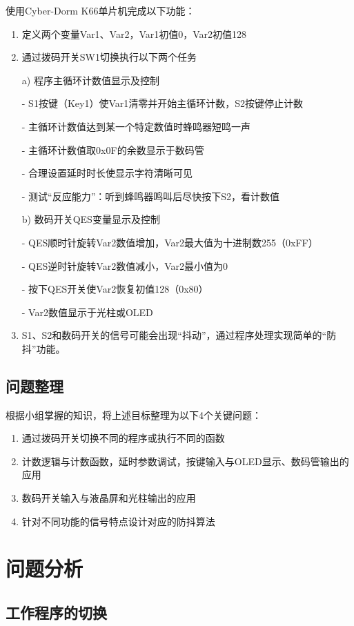 \documentclass[12pt]{article}
\begin{document}
使用Cyber-Dorm K66单片机完成以下功能：
\begin{enumerate}
	\item 定义两个变量Var1、Var2，Var1初值0，Var2初值128
	
	\item 通过拨码开关SW1切换执行以下两个任务
	
	a) 程序主循环计数值显示及控制

    - S1按键（Key1）使Var1清零并开始主循环计数，S2按键停止计数

    - 主循环计数值达到某一个特定数值时蜂鸣器短鸣一声

    - 主循环计数值取0x0F的余数显示于数码管

    - 合理设置延时时长使显示字符清晰可见

    - 测试“反应能力”：听到蜂鸣器鸣叫后尽快按下S2，看计数值

  b) 数码开关QES变量显示及控制

    - QES顺时针旋转Var2数值增加，Var2最大值为十进制数255（0xFF）

    - QES逆时针旋转Var2数值减小，Var2最小值为0

    - 按下QES开关使Var2恢复初值128（0x80）

    - Var2数值显示于光柱或OLED
	\item S1、S2和数码开关的信号可能会出现“抖动”，通过程序处理实现简单的“防抖”功能。
\end{enumerate}

\subsection{问题整理}

根据小组掌握的知识，将上述目标整理为以下4个关键问题：

\begin{enumerate}
	\item 通过拨码开关切换不同的程序或执行不同的函数
	\item 计数逻辑与计数函数，延时参数调试，按键输入与OLED显示、数码管输出的应用
	\item 数码开关输入与液晶屏和光柱输出的应用
	\item 针对不同功能的信号特点设计对应的防抖算法
\end{enumerate}

\section{问题分析}


\subsection{工作程序的切换}
\end{document}

